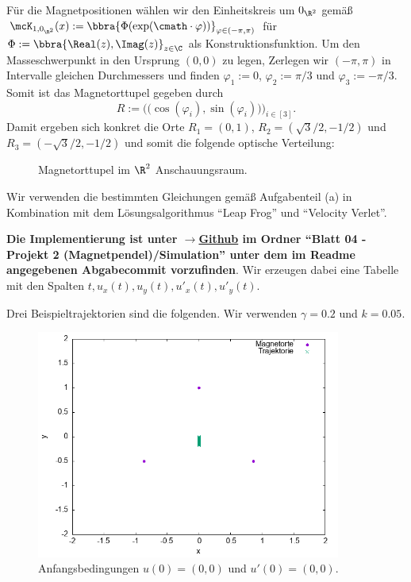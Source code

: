 \documentclass[
    oneside,
    ngerman,
    footinclude=false,
    captions=tableheading,
    DIV=12
]{scrartcl}
\begin{document}
\subaufgabe{}
    Für die Magnetpositionen wählen wir den Einheitskreis um $0_{\R^2}$ gemäß $\mcK_{1,0_{\R^2}}(x):=\bbra{\Phi({\exp}(\cmath\cdot\varphi))}_{\varphi\in(-\pi,\pi)}$ für $\Phi:=\bbra{\Real(z),\Imag(z)}_{z\in\C}$ als Konstruktionsfunktion. Um den Masseschwerpunkt in den Ursprung $(0,0)$ zu legen, Zerlegen wir $(-\pi,\pi)$ in Intervalle gleichen Durchmessers und finden $\varphi_1:=0$, $\varphi_2:=\pi/3$ und $\varphi_3:=-\pi/3$. Somit ist das Magnetorttupel gegeben durch
    \[
        R:=\Big(\big(\cos(\varphi_i),\sin(\varphi_i)\big)\Big)_{i\in[3]}.
    \]
    Damit ergeben sich konkret die Orte $R_1 = (0,1)$, $R_2 = (\sqrt{3}/2,-1/2)$ und $R_3 = (-\sqrt{3}/2,-1/2)$ und somit die folgende optische Verteilung:
    \begin{figure}[H]
        \centering
        \caption{Magnetorttupel im $\R^2$ Anschauungsraum.}
    \end{figure}


\subaufgabe{}
    Wir verwenden die bestimmten Gleichungen gemäß Aufgabenteil (a) in Kombination mit dem Lösungsalgorithmus \enquote{Leap Frog} und \enquote{Velocity Verlet}. 

\subaufgabe{}
    \textbf{Die Implementierung ist unter $\to$\href{https://github.com/unb3rechenbar/ComputerPhysik-I-Projekte.git}{Github} im Ordner \enquote{Blatt 04 - Projekt 2 (Magnetpendel)/Simulation} unter dem im Readme angegebenen Abgabecommit vorzufinden}. Wir erzeugen dabei eine Tabelle mit den Spalten $t,u_x(t),u_y(t),u'_x(t),u'_y(t)$. 

\subaufgabe{}
    Drei Beispieltrajektorien sind die folgenden. Wir verwenden $\gamma = 0.2$ und $k = 0.05$. 
    \begin{figure}[H]
        \centering
        \includegraphics[width=10cm]{../Simulation/img/trcs/velverl3-0-0-0-0.png}
        \caption{Anfangsbedingungen $u(0) = (0,0)$ und $u'(0) = (0,0)$.}
    \end{figure}
\end{document}
